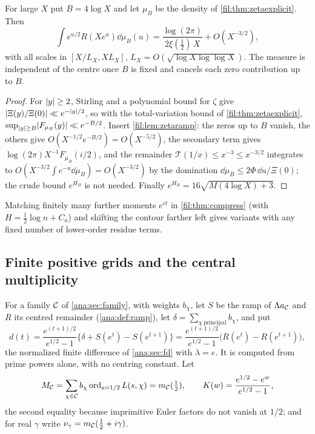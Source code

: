 \begin{theorem}\label{fil:thm:zetaprime}
For large $X$ put $B=4\log X$ and let $\mu_B$ be the density of \cref{fil:thm:zetaexplicit}. Then
\[
 \int e^{u/2}R(Xe^u)\dd\mu_B(u)=\frac{\log(2\pi)}{2\xi(\tfrac12)\,X}+O(X^{-3/2}),
\]
with all scales in $[X/L_X,XL_X]$, $L_X=O(\sqrt{\log X\log\log X})$. The measure is independent of the centre once
$B$ is fixed and cancels each zero contribution up to $B$.
\end{theorem}

\begin{proof}
For $\lvert y\rvert\ge2$, Stirling and a polynomial bound for $\zeta$ give $\lvert\Xi(y)/\Xi(0)\rvert\ll e^{-\lvert y\rvert/2}$, so with
the total-variation bound of \cref{fil:thm:zetaexplicit}, $\sup_{\lvert y\rvert\ge B}\lvert F_{\mu_B}(y)\rvert\ll e^{-B/2}$. Insert
\cref{fil:lem:zetaramp}: the zeros up to $B$ vanish, the others give $O(X^{-1/2}e^{-B/2})=O(X^{-5/2})$, the secondary
term gives $\log(2\pi)X^{-1}F_{\mu_B}(i/2)$, and the remainder $\mathcal T(1/x)\le x^{-3}\le x^{-3/2}$ integrates to
$O(X^{-3/2}\int e^{-u}\dd\mu_B)=O(X^{-3/2})$ by the domination $\dd\mu_B\le2\Phi\,\dd u/\Xi(0)$; the crude bound $e^{H_B}$ is
not needed. Finally $e^{H_B}=16\sqrt{M(4\log X)+3}$.
\end{proof}

Matching finitely many further moments $e^{ct}$ in \cref{fil:thm:compress} (with $H=\tfrac12\log n+C_a$) and shifting
the contour farther left gives variants with any fixed number of lower-order residue terms.

\subsection{Finite positive grids and the central multiplicity}\label{fil:sec:grids}
{\raggedright{}}

For a family $\mathcal{C}$ of \cref{ana:sec:family}, with weights $b_\chi$, let $S$ be the ramp of $\Lambda a_{\mathcal{C}}$ and $R$ its centred
remainder (\cref{ana:def:ramp}), let $\delta=\sum_{\chi\ \mathrm{principal}}b_\chi$, and put
\[
 d(t)=\frac{e^{(t+1)/2}}{e^{1/2}-1}\bigl\{\delta+S(e^t)-S(e^{t+1})\bigr\}
 =\frac{e^{(t+1)/2}}{e^{1/2}-1}\bigl(R(e^t)-R(e^{t+1})\bigr),
\]
the normalized finite difference of \cref{ana:sec:fd} with $\lambda=e$. It is computed from
prime powers alone, with no centring constant. Let
\[
 M_{\mathcal{C}}=\sum_{\chi\in\mathcal{C}}b_\chi\operatorname{ord}_{s=1/2}L(s,\chi)=m_{\mathcal{C}}(\tfrac12),\qquad
 K(w)=\frac{e^{1/2}-e^w}{e^{1/2}-1},
\]
the second equality because imprimitive Euler factors do not vanish at $1/2$; and for real
$\gamma$ write $\nu_\gamma=m_{\mathcal{C}}(\frac12+i\gamma)$.

